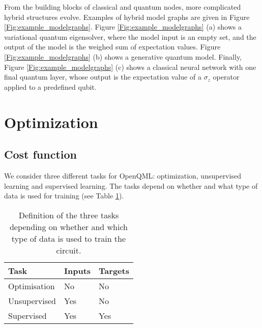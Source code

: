 \documentclass[aps,pra,10pt,twocolumn,groupedaddress,nofootinbib]{revtex4-1}
\theoremstyle{plain}
\begin{document}
\begin{figure*}[t]
\begin{flushleft}
\end{flushleft}
\caption{Examples of model graphs. Turqois nodes depict quantum nodes, and orange nodes depict classical nodes. (a) Model graph of a variational quantum eigensolver, in which expectation values of local Pauli operators are combined by a classical layer to an expectation value of a global Hamiltonian. (b)  A model, here a generative model) can even have different architectures for training and data generation. While the model is trained maximising the expectation of a quantum operator $\Lambda_{\mathcal{D}}$ that projects onto a `training set subspace' of Hilbert space, it can be used to sample data by performing a single computational basis measurement (i.e., $R=1$). (c) Model graph of a classical neural network with a final quantum layer that computes the scalar output.}
\label{Fig:example_modelgraphs}
\end{figure*}


From the building blocks of classical and quantum nodes, more complicated hybrid structures evolve. Examples of hybrid model graphs are given in Figure \ref{Fig:example_modelgraphs}. Figure \ref{Fig:example_modelgraphs} (a) shows a variational quantum eigensolver, where the model input is an empty set, and the output of the model is the weighed sum of expectation values. Figure \ref{Fig:example_modelgraphs} (b) shows a generative quantum model. Finally, Figure \ref{Fig:example_modelgraphs} (c) shows a classical neural network with one final quantum layer, whose output is the expectation value of a $\sigma_z$ operator applied to a predefined qubit.

\section{Optimization}


\subsection{Cost function}
We consider three different tasks for OpenQML: optimization, unsupervised learning and supervised learning. The tasks depend on whether and what type of data is used for training (see Table \ref{Tbl:tasks}).\\

\begin{table}[t]
\begin{tabular}{lll}
\hline \hline
Task & Inputs & Targets\\
\hline
Optimisation & No & No \\
Unsupervised & Yes & No\\
Supervised & Yes & Yes\\\hline \hline
\end{tabular}
\caption{Definition of the three tasks depending on whether and which type of data is used to train the circuit.}
\label{Tbl:tasks}
\end{table}
\end{document}
